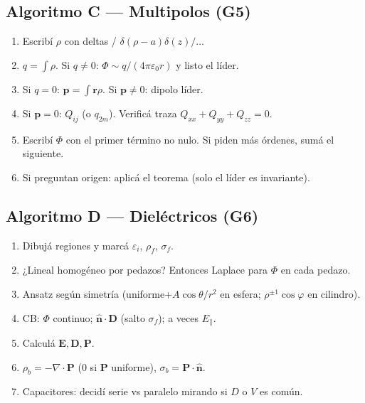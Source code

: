 \documentclass[10pt,a4paper]{article}
\newcommand{\vect}[1]{\mathbf{#1}}
\newcommand{\uv}[1]{\hat{\mathbf{#1}}}
\newcommand{\eps}{\varepsilon}
\newcommand{\epso}{\varepsilon_0}
\begin{document}
\subsection{Algoritmo C --- Multipolos (G5)}
\begin{enumerate}
\item Escribí $\rho$ con deltas / $\delta(\rho-a)\delta(z)/...$
\item $q=\int\rho$. Si $q\neq 0$: $\Phi\sim q/(4\pi\epso r)$ y listo el líder.
\item Si $q=0$: $\vect{p}=\int\vect{r}\rho$. Si $\vect{p}\neq 0$: dipolo líder.
\item Si $\vect{p}=0$: $Q_{ij}$ (o $q_{2m}$). Verificá traza $Q_{xx}+Q_{yy}+Q_{zz}=0$.
\item Escribí $\Phi$ con el primer término no nulo. Si piden más órdenes, sumá el siguiente.
\item Si preguntan origen: aplicá el teorema (solo el líder es invariante).
\end{enumerate}

\subsection{Algoritmo D --- Dieléctricos (G6)}
\begin{enumerate}
\item Dibujá regiones y marcá $\eps_i$, $\rho_f$, $\sigma_f$.
\item ¿Lineal homogéneo por pedazos? Entonces Laplace para $\Phi$ en cada pedazo.
\item Ansatz según simetría (uniforme+$A\cos\theta/r^2$ en esfera; $\rho^{\pm 1}\cos\varphi$ en cilindro).
\item CB: $\Phi$ continuo; $\uv{n}\cdot\vect{D}$ (salto $\sigma_f$); a veces $E_\parallel$.
\item Calculá $\vect{E},\vect{D},\vect{P}$.
\item $\rho_b=-\nabla\cdot\vect{P}$ (0 si $\vect{P}$ uniforme), $\sigma_b=\vect{P}\cdot\uv{n}$.
\item Capacitores: decidí serie vs paralelo mirando si $D$ o $V$ es común.
\end{enumerate}
\end{document}
